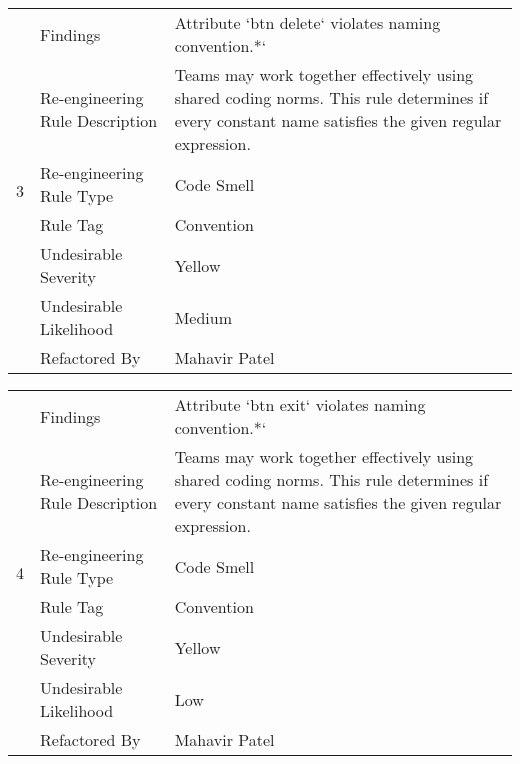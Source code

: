 \documentclass[12pt,english]{article}
\begin{document}
\begin{table}[!ht]
    \begin{tabularx}{\textwidth}{|c|l|X|}
    \hline
        \multirow{7}{*}{3} & Findings & Attribute ‘btn delete‘ violates naming convention.*‘ \\ \cline{2-3}
        & Re-engineering Rule Description & Teams may work together effectively using shared coding norms. This rule determines if every constant name satisfies the given regular expression.
 \\ \cline{2-3}
        & Re-engineering Rule Type & Code Smell \\ \cline{2-3}
        & Rule Tag & Convention \\ \cline{2-3}
        & Undesirable Severity & Yellow \\ \cline{2-3}
        & Undesirable Likelihood & Medium \\ \cline{2-3}
        & Refactored By & Mahavir Patel \\ \hline
    \end{tabularx}
\end{table}

\begin{table}[!ht]
    \begin{tabularx}{\textwidth}{|c|l|X|}
    \hline
        \multirow{7}{*}{4} & Findings & Attribute ‘btn exit‘ violates naming convention.*‘ \\ \cline{2-3}
        & Re-engineering Rule Description & Teams may work together effectively using shared coding norms. This rule determines if every constant name satisfies the given regular expression.
        \\ \cline{2-3}
        & Re-engineering Rule Type & Code Smell  \\ \cline{2-3}
        & Rule Tag & Convention \\ \cline{2-3}
        & Undesirable Severity & Yellow \\ \cline{2-3}
        & Undesirable Likelihood & Low \\ \cline{2-3}
        & Refactored By & Mahavir Patel \\ \hline
    \end{tabularx}
\end{table}
\end{document}
